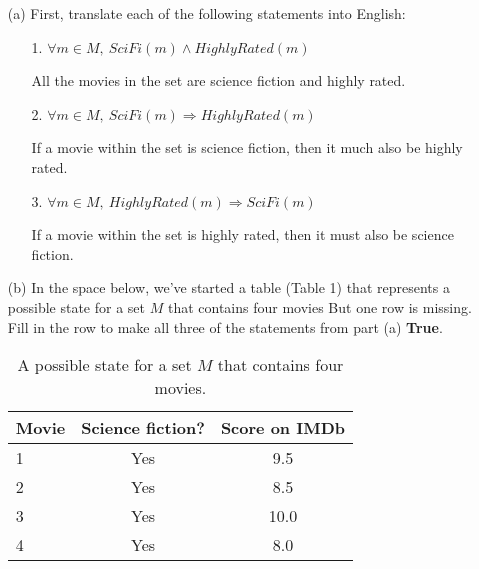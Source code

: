 \documentclass{article}
\begin{document}
\begin{enumerate}
\item[(a)]
First, translate each of the following statements into English:

\begin{enumerate}
\item[1.]
$\forall m \in M,~ SciFi(m) \land HighlyRated(m)$

\begin{framed}
All the movies in the set are science fiction and highly rated.
\end{framed}

\item[2.]
$\forall m \in M,~ SciFi(m) \Rightarrow HighlyRated(m)$

\begin{framed}
If a movie within the set is science fiction, then it much also be highly rated.
\end{framed}

\item[3.] $\forall m \in M,~ HighlyRated(m) \Rightarrow SciFi(m)$

\begin{framed}
If a movie within the set is highly rated, then it must also be science fiction.
\end{framed}

\end{enumerate}

\item[(b)]
In the space below, we've started a table (Table 1) that represents a possible state for a set $M$ that contains four movies
But one row is missing.
Fill in the row to make all three of the statements from part (a) \textbf{True}.

\begin{table}[h!]
\centering
\caption{A possible state for a set $M$ that contains four movies.}
\begin{tabular}{|l|c|c|}
\hline
\textbf{Movie} & \textbf{Science fiction?} & \textbf{Score on IMDb} \\
\hline
1 & Yes & 9.5 \\
\hline
2 & Yes & 8.5 \\
\hline
3 & Yes & 10.0 \\
\hline
4 & Yes & 8.0 \\ %
\hline
\end{tabular}
\end{table}

\end{enumerate}
\end{document}
